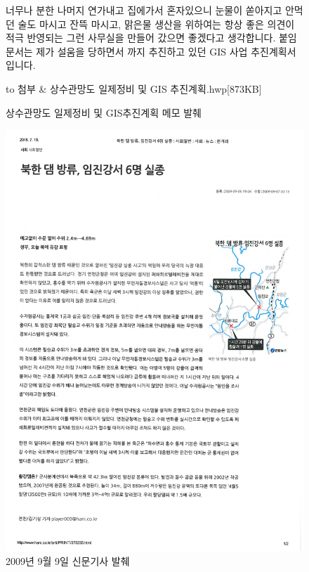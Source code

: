 \documentclass[chapter,book,openany,twoside]{oblivoir}
\begin{document}
\begin{figure}
\begin{tabu}
너무나 분한 나머지 연가내고 집에가서 혼자있으니 눈물이 쏟아지고 안먹던 술도 마시고 잔뜩 마시고, 맑은물 생산을 위하여는 항상 좋은 의견이 적극 반영되는 그런 사무실을 만들어 갔으면 좋겠다고 생각합니다. 붙임 문서는 제가 설움을 당하면서 까지 추진하고 있던 GIS 사업 추진계획서 입니다.
\end{tabu}
\tabulinesep=1.2mm
\begin{tabu}  to \linewidth {|X[1,c]|X[4,c]|}
\hline
첨부 & 상수관망도 일제정비 및 GIS 추진계획.hwp[873KB] \\ \hline
\end{tabu}

\caption{상수관망도 일제정비 및 GIS추진계획 메모 발췌}
\end{figure}
\newpage

\begin{figure}[t]
\centering \includegraphics[scale=.5]{DBs/pic/007.jpg}
\caption{2009년 9월 9일 신문기사 발췌}
\end{figure}
\end{document}
